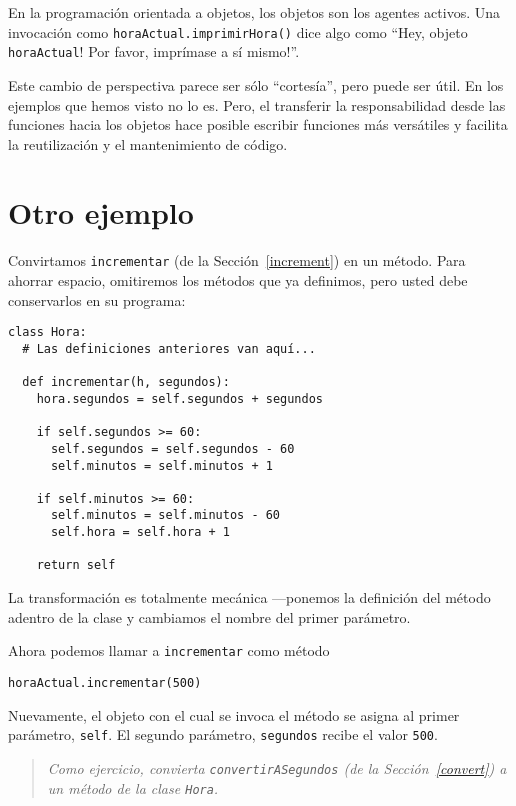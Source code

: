 En la programación orientada a objetos, los objetos son 
los agentes activos. Una invocación como \texttt{horaActual.imprimirHora()} 
dice algo como  ``Hey, objeto \texttt{horaActual}!  Por favor, imprímase a 
sí mismo!''.

Este cambio de perspectiva parece ser sólo ``cortesía'', pero puede
ser útil. En los ejemplos que hemos visto no lo es. Pero, el 
transferir la responsabilidad desde las funciones hacia los
objetos hace posible escribir funciones más versátiles y 
facilita la reutilización y el mantenimiento de código.


\section{Otro ejemplo}

Convirtamos  \texttt{incrementar} (de la Sección~\ref{increment}) en un método. Para ahorrar
espacio, omitiremos los métodos que ya definimos, pero 
usted debe conservarlos en su programa:


\beforeverb
\begin{verbatim}
class Hora:
  # Las definiciones anteriores van aquí...
  
  def incrementar(h, segundos):
    hora.segundos = self.segundos + segundos

    if self.segundos >= 60:
      self.segundos = self.segundos - 60
      self.minutos = self.minutos + 1

    if self.minutos >= 60:
      self.minutos = self.minutos - 60
      self.hora = self.hora + 1

    return self

\end{verbatim}
\afterverb
%
La transformación es totalmente mecánica ---ponemos la definición 
del método adentro de la clase y cambiamos el nombre del primer
parámetro.

Ahora podemos llamar a  \texttt{incrementar} como método

\beforeverb
\begin{verbatim}
horaActual.incrementar(500)
\end{verbatim}
\afterverb
%
Nuevamente, el objeto con el cual se invoca el método se asigna
al primer parámetro, \texttt{self}. El segundo parámetro, 
\texttt{segundos} recibe el valor \texttt{500}.

\begin{quote}
{\em Como ejercicio, convierta \texttt{convertirASegundos} 
(de la Sección~\ref{convert}) a un método de la clase
\texttt{Hora}.}
\end{quote}


